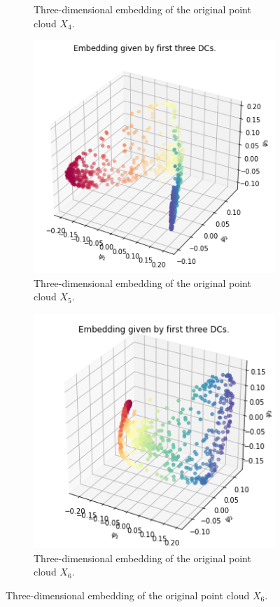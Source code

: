 \begin{figure}[H]
\begin{subfigure}[b]{0.3\textwidth}
    \caption{Three-dimensional embedding of the original point cloud $X_4$.}
\end{subfigure}
\hfill
\begin{subfigure}[b]{0.3\textwidth}
    \includegraphics[width=\textwidth]{figures/topology/X5_embedding.png}
    \caption{Three-dimensional embedding of the original point cloud $X_5$.}
\end{subfigure}
\hfill
\begin{subfigure}[b]{0.3\textwidth}
    \includegraphics[width=\textwidth]{figures/topology/X6_embedding.png}
    \caption{Three-dimensional embedding of the original point cloud $X_6$.}
\end{subfigure}
\end{figure}
